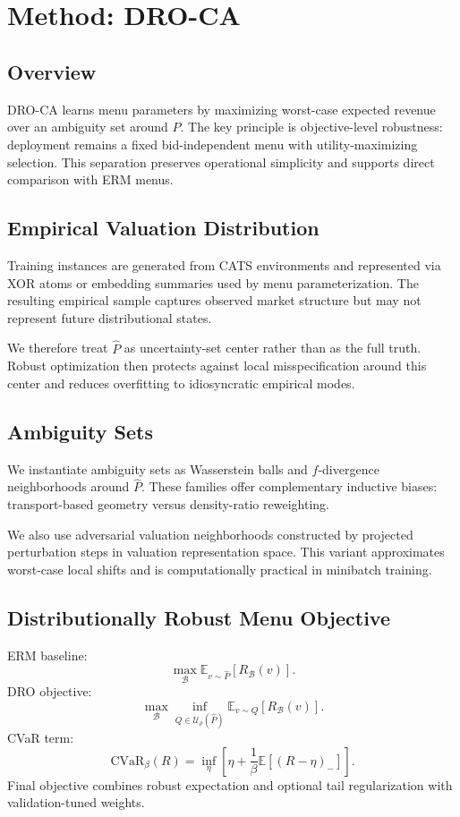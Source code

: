 \documentclass{article}
\newcommand{\E}{\mathbb{E}}
\begin{document}
\section{Method: DRO-CA}
\subsection{Overview}
DRO-CA learns menu parameters by maximizing worst-case expected revenue over an ambiguity set around $\widehat P$. The key principle is objective-level robustness: deployment remains a fixed bid-independent menu with utility-maximizing selection. This separation preserves operational simplicity and supports direct comparison with ERM menus.

\subsection{Empirical Valuation Distribution}
Training instances are generated from CATS environments and represented via XOR atoms or embedding summaries used by menu parameterization. The resulting empirical sample captures observed market structure but may not represent future distributional states.

We therefore treat $\widehat P$ as uncertainty-set center rather than as the full truth. Robust optimization then protects against local misspecification around this center and reduces overfitting to idiosyncratic empirical modes.

\subsection{Ambiguity Sets}
We instantiate ambiguity sets as Wasserstein balls and $f$-divergence neighborhoods around $\widehat P$. These families offer complementary inductive biases: transport-based geometry versus density-ratio reweighting.

We also use adversarial valuation neighborhoods constructed by projected perturbation steps in valuation representation space. This variant approximates worst-case local shifts and is computationally practical in minibatch training.

\subsection{Distributionally Robust Menu Objective}
ERM baseline:
\[\max_{\mathcal B}\E_{v\sim\widehat P}[R_{\mathcal B}(v)].\]
DRO objective:
\[\max_{\mathcal B}\inf_{Q\in\mathcal U_\rho(\widehat P)}\E_{v\sim Q}[R_{\mathcal B}(v)].\]
CVaR term:
\[\mathrm{CVaR}_{\beta}(R)=\inf_{\eta}\left[\eta+\frac1\beta\E[(R-\eta)_-]\right].\]
Final objective combines robust expectation and optional tail regularization with validation-tuned weights.
\end{document}
